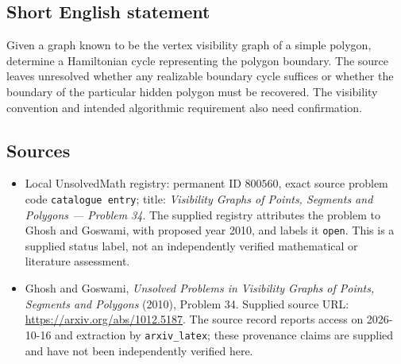 \documentclass[11pt]{article}
\begin{document}
\subsection{Short English statement}
Given a graph known to be the vertex visibility graph of a simple polygon, determine a Hamiltonian cycle representing the polygon boundary. The source leaves unresolved whether any realizable boundary cycle suffices or whether the boundary of the particular hidden polygon must be recovered. The visibility convention and intended algorithmic requirement also need confirmation.
\subsection{Sources}
\begin{itemize}
\item Local UnsolvedMath registry: permanent ID \(800560\), exact source problem code \texttt{catalogue entry}; title: \emph{Visibility Graphs of Points, Segments and Polygons --- Problem 34}. The supplied registry attributes the problem to Ghosh and Goswami, with proposed year 2010, and labels it \texttt{open}. This is a supplied status label, not an independently verified mathematical or literature assessment.
\item Ghosh and Goswami, \emph{Unsolved Problems in Visibility Graphs of Points, Segments and Polygons} (2010), Problem 34. Supplied source URL: \url{https://arxiv.org/abs/1012.5187}. The source record reports access on 2026-10-16 and extraction by \texttt{arxiv\_latex}; these provenance claims are supplied and have not been independently verified here.
\end{itemize}
\end{document}
